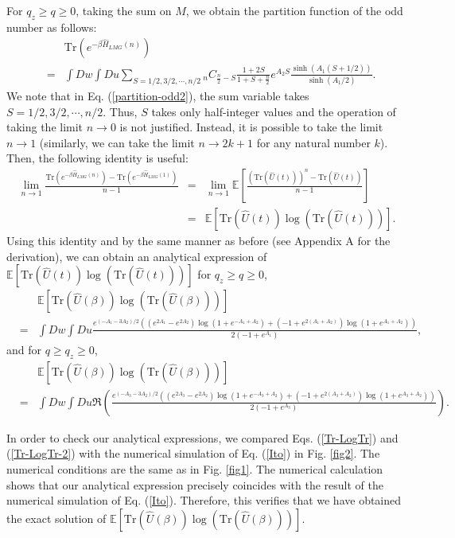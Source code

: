 \documentclass[
aps,
pre,
showpacs
]{revtex4-1}
\newcommand{\be}{\begin{eqnarray}}
\newcommand{\ee}{\end{eqnarray}}
\newcommand{\no}{\nonumber}
\newcommand{\Tr}{\mbox{Tr} }
\begin{document}
For $q_z\ge q \ge 0$, taking the sum on $M$, we obtain the partition function of the odd number as follows:
\be
&&\Tr\left( e^{-\beta\hat{H}_{LMG}(n)  }\right)
\no\\
&=& \int Dw \int Du  \sum_{S=1/2,3/2,\cdots,n/2}^{}  {}_n C _{\frac{n}{2}-S} \frac{1+2S}{1+S+\frac{n}{2}} e^{A_2 S}\frac{\sinh(A_1(S+1/2))}{\sinh(A_1/2)} .
\label{partition-odd2}
\ee
We note that in Eq. (\ref{partition-odd2}), the sum variable takes $S=1/2,3/2,\cdots,n/2$. Thus, $S$ takes only half-integer values and the operation of taking the limit $n\to0$ is not justified.
Instead, it is possible to take the limit $n\to1$ (similarly, we can take the limit $n\to 2k+1$ for any natural number $k$).
 Then, the following identity is useful:
\be
\lim_{n\rightarrow1}    \frac{ \Tr\left( e^{-\beta\hat{H}_{LMG}(n)  }\right)- \Tr\left( e^{-\beta\hat{H}_{LMG}(1)  }\right)  }{n-1} 
&=&\lim_{n\rightarrow1} \mathbb{E} \left[   \frac{ \left( \Tr \left(\hat{U}(t)\right) \right)^{n}-  \Tr \left(\hat{U}(t)\right)  }{n-1} \right] 
\no\\
&=&\mathbb{E} \left[ \Tr \left(\hat{U}(t)\right)\log\left( \Tr \left(\hat{U}(t)\right) \right) \right]  .
\ee
Using this identity and by the same manner as before (see Appendix A for the derivation), we can obtain an analytical expression of $\mathbb{E} \left[ \Tr \left(\hat{U}(t)\right)\log\left( \Tr \left(\hat{U}(t)\right) \right) \right] $ for $q_z\ge q \ge 0$,
\be
&&\mathbb{E} \left[ \Tr \left(\hat{U}(\beta)\right)\log\left( \Tr \left(\hat{U}(\beta)\right) \right) \right] 
\no\\
&=& \int Dw \int Du\frac{e^{(-A_1-3A_2)/2}\left( (e^{2A_1}-e^{2A_2})\log(1+e^{-A_1+A_2}) +(-1+e^{2(A_1+A_2)}) \log(1+e^{A_1+A_2}) \right)}{2(-1+e^{A_1})}  , \label{Tr-LogTr}
\ee
and for $q\ge q_z \ge 0$,
\be
&&\mathbb{E} \left[ \Tr \left(\hat{U}(\beta)\right)\log\left( \Tr \left(\hat{U}(\beta)\right) \right) \right] 
\no\\
&=& \int Dw \int Du \Re\left(\frac{e^{(-A_3-3A_2)/2}\left( (e^{2A_3}-e^{2A_2})\log(1+e^{-A_3+A_2}) +(-1+e^{2(A_3+A_2)}) \log(1+e^{A_3+A_2}) \right)}{2(-1+e^{A_3})}  \right). \label{Tr-LogTr-2}
\ee

In order to check our analytical expressions, we compared Eqs. (\ref{Tr-LogTr}) and (\ref{Tr-LogTr-2}) with the numerical simulation of Eq. (\ref{Ito}) in Fig. \ref{fig2}.
The numerical conditions are the same as in Fig. \ref{fig1}.
The numerical calculation shows that our analytical expression precisely coincides with the result of the numerical simulation of Eq. (\ref{Ito}).
Therefore, this verifies that we have obtained the exact solution of $\mathbb{E} \left[ \Tr \left(\hat{U}(\beta)\right)\log\left( \Tr \left(\hat{U}(\beta)\right) \right) \right]$.
\end{document}
